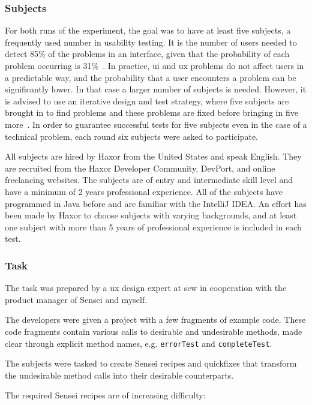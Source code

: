 \subsubsection{Subjects}
For both runs of the experiment, the goal was to have at least five subjects, a frequently used number in usability testing.
It is the number of users needed to detect 85\% of the problems in an interface, given that the probability of each problem occurring is 31\%~\cite{nielsen1993mathematical}.
In practice, \gls{ui} and \gls{ux} problems do not affect users in a predictable way, and the probability that a user encounters a problem can be significantly lower.
In that case a larger number of subjects is needed.
However, it is advised to use an iterative design and test strategy, where five subjects are brought in to find problems and these problems are fixed before bringing in five more~\cite{nielsen1993mathematical}.
In order to guarantee successful tests for five subjects even in the case of a technical problem, each round six subjects were asked to participate.

All subjects are hired by Haxor from the United States and speak English.
They are recruited from the Haxor Developer Community, DevPort, and online freelancing websites.
The subjects are of entry and intermediate skill level and have a minimum of 2 years professional experience.
All of the subjects have programmed in Java before and are familiar with the IntelliJ IDEA.
An effort has been made by Haxor to choose subjects with varying backgrounds, and at least one subject with more than 5 years of professional experience is included in each test.

\subsubsection{Task}
The task was prepared by a \gls{ux} design expert at \gls{scw} in cooperation with the product manager of Sensei and myself.

The developers were given a project with a few fragments of example code.
These code fragments contain various calls to desirable and undesirable methods, made clear through explicit method names, e.g. \texttt{errorTest} and \texttt{completeTest}.

The subjects were tasked to create Sensei recipes and quickfixes that transform the undesirable method calls into their desirable counterparts.

The required Sensei recipes are of increasing difficulty:


